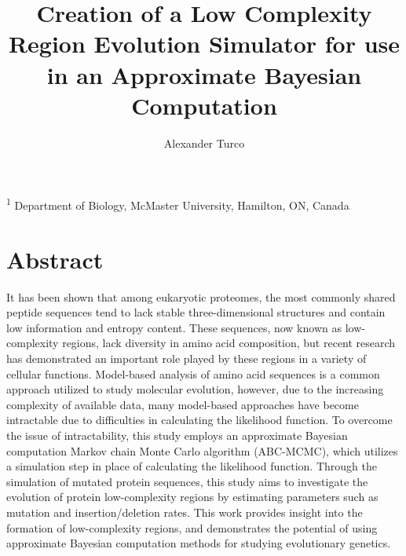 \documentclass[10pt]{article}
\title{\sc Creation of a Low Complexity Region Evolution Simulator for use in an Approximate Bayesian Computation}
\author{\sc Alexander Turco}
\begin{document}

\onecolumn
                        \maketitle

\thispagestyle{empty}
\noindent \textsuperscript{1} Department of Biology, McMaster University, Hamilton, ON, Canada

\newpage
\tableofcontents
\newpage
       
\section{Abstract} 

It has been shown that among eukaryotic proteomes, the most commonly shared peptide sequences tend to lack stable three-dimensional structures and contain low information and entropy content. These sequences, now known as low-complexity regions, lack diversity in amino acid composition, but recent research has demonstrated an important role played by these regions in a variety of cellular functions. Model-based analysis of amino acid sequences is a common approach utilized to study molecular evolution, however, due to the increasing complexity of available data, many model-based approaches have become intractable due to difficulties in calculating the likelihood function. To overcome the issue of intractability, this study employs an approximate Bayesian computation Markov chain Monte Carlo algorithm (ABC-MCMC), which utilizes a simulation step in place of calculating the likelihood function. Through the simulation of mutated protein sequences, this study aims to investigate the evolution of protein low-complexity regions by estimating parameters such as mutation and insertion/deletion rates. This work provides insight into the formation of low-complexity regions, and demonstrates the potential of using approximate Bayesian computation methods for studying evolutionary genetics. 

\bigskip
                        
                        
\end{document}
